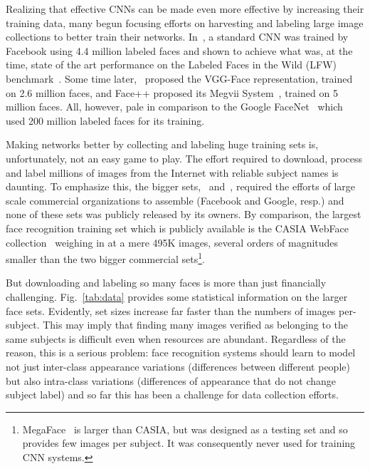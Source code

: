 \documentclass[runningheads]{llncs}
\begin{document}
Realizing that effective CNNs can be made even more effective by increasing their training data, many begun focusing efforts on harvesting and labeling large image collections to better train their networks. In~\cite{taigman2014deepface}, a standard CNN was trained by Facebook using 4.4 million labeled faces and shown to achieve what was, at the time, state of the art performance on the Labeled Faces in the Wild (LFW) benchmark~\cite{LFWTech}. Some time later,~\cite{parkhi2015deep} proposed the VGG-Face representation, trained on 2.6 million faces, and Face++ proposed its Megvii System~\cite{megaVii}, trained on 5 million faces. All, however, pale in comparison to the Google FaceNet~\cite{schroff2015facenet} which used 200 million labeled faces for its training. 

Making networks better by collecting and labeling huge training sets is, unfortunately, not an easy game to play. The effort required to download, process and label millions of images from the Internet with reliable subject names is daunting. To emphasize this, the bigger sets,~\cite{taigman2014deepface} and~\cite{schroff2015facenet}, required the efforts of large scale commercial organizations to assemble (Facebook and Google, resp.) and none of these sets was publicly released by its owners. By comparison, the largest face recognition training set which is publicly available is the CASIA WebFace collection~\cite{yi2014learning} weighing in at a mere 495K images, several orders of magnitudes smaller than the two bigger commercial sets\footnote{MegaFace~\cite{kemelmacher2016megaface} is larger than CASIA, but was designed as a testing set and so provides few images per subject. It was consequently never used for training CNN systems.}.

But downloading and labeling so many faces is more than just financially challenging. Fig.~\ref{tab:data} provides some statistical information on the larger face sets. Evidently, set sizes increase far faster than the numbers of images per-subject. This may imply that finding many images verified as belonging to the same subjects is difficult even when resources are abundant. Regardless of the reason, this is a serious problem: face recognition systems should learn to model not just inter-class appearance variations (differences between different people) but also intra-class variations (differences of appearance that do not change subject label) and so far this has been a challenge for data collection efforts.
\end{document}
